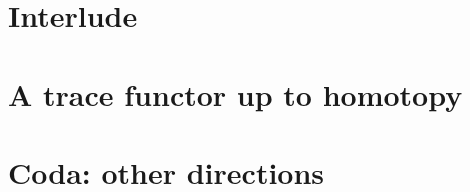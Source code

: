 \documentclass[12pt, draft]{nuthesis} %
\theoremstyle{definition}
\theoremstyle{remark}
\theoremstyle{example}
\begin{document}
\chapter{Interlude} \label{chap:interlude}
	
	

\chapter{A trace functor up to homotopy} \label{chap:trace_up_to_homotopy}
	
	
	
	
	

\chapter{Coda: other directions} \label{chap:coda}
	

\begin{singlespace}
\clearpage{} %

\end{singlespace}

\appendix		%




\end{document}
